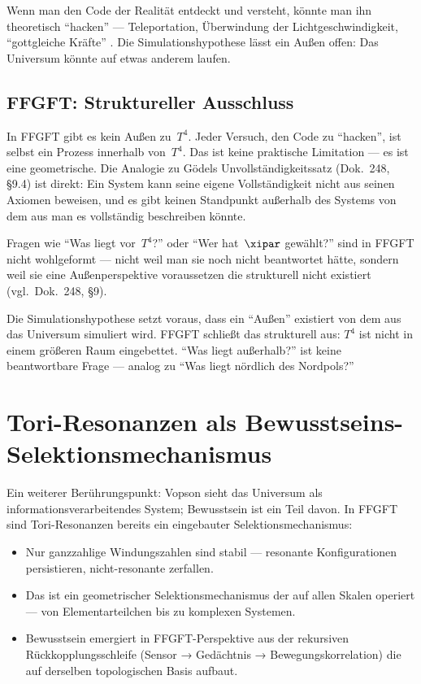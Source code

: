 Wenn man den Code der Realität entdeckt und versteht, könnte man ihn
theoretisch ``hacken'' --- Teleportation, Überwindung der Lichtgeschwindigkeit,
``gottgleiche Kräfte'' \cite{Vopson2024}. Die Simulationshypothese lässt
ein Außen offen: Das Universum könnte auf etwas anderem laufen.

\subsection{FFGFT: Struktureller Ausschluss}

In FFGFT gibt es kein Außen zu~$T^4$. Jeder Versuch, den Code zu ``hacken'',
ist selbst ein Prozess innerhalb von~$T^4$. Das ist keine praktische Limitation
--- es ist eine geometrische. Die Analogie zu Gödels Unvollständigkeitssatz
(Dok.~248, §9.4) ist direkt: Ein System kann seine eigene Vollständigkeit nicht
aus seinen Axiomen beweisen, und es gibt keinen Standpunkt außerhalb des
Systems von dem aus man es vollständig beschreiben könnte.

Fragen wie ``Was liegt vor~$T^4$?'' oder ``Wer hat~$\xipar$ gewählt?'' sind
in FFGFT nicht wohlgeformt --- nicht weil man sie noch nicht beantwortet
hätte, sondern weil sie eine Außenperspektive voraussetzen die strukturell
nicht existiert (vgl.\ Dok.~248, §9).

\begin{wichtig}
Die Simulationshypothese setzt voraus, dass ein ``Außen'' existiert von dem
aus das Universum simuliert wird. FFGFT schließt das strukturell aus: $T^4$
ist nicht in einem größeren Raum eingebettet. ``Was liegt außerhalb?'' ist
keine beantwortbare Frage --- analog zu ``Was liegt nördlich des Nordpols?''
\end{wichtig}

\section{Tori-Resonanzen als Bewusstseins-Selektionsmechanismus}

Ein weiterer Berührungspunkt: Vopson sieht das Universum als
informationsverarbeitendes System; Bewusstsein ist ein Teil davon. In FFGFT
sind Tori-Resonanzen bereits ein eingebauter Selektionsmechanismus:

\begin{itemize}
  \item Nur ganzzahlige Windungszahlen sind stabil --- resonante
    Konfigurationen persistieren, nicht-resonante zerfallen.
  \item Das ist ein geometrischer Selektionsmechanismus der auf allen Skalen
    operiert --- von Elementarteilchen bis zu komplexen Systemen.
  \item Bewusstsein emergiert in FFGFT-Perspektive aus der rekursiven
    Rückkopplungsschleife (Sensor → Gedächtnis → Bewegungskorrelation)
    die auf derselben topologischen Basis aufbaut.
\end{itemize}

